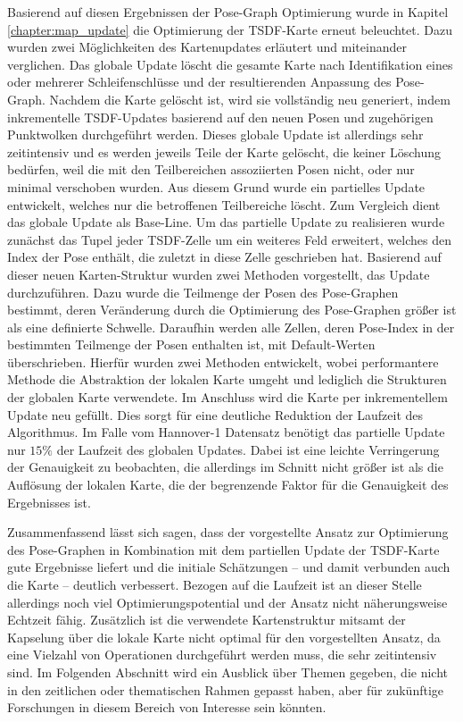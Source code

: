 Basierend auf diesen Ergebnissen der Pose-Graph Optimierung wurde in Kapitel \ref{chapter:map_update} die Optimierung der TSDF-Karte erneut beleuchtet. Dazu wurden zwei Möglichkeiten des Kartenupdates erläutert und miteinander verglichen. Das globale Update löscht die gesamte Karte nach Identifikation eines oder mehrerer Schleifenschlüsse und der resultierenden Anpassung des Pose-Graph. Nachdem die Karte gelöscht ist, wird sie vollständig neu generiert, indem inkrementelle TSDF-Updates basierend auf den neuen Posen und zugehörigen Punktwolken durchgeführt werden. Dieses globale Update ist allerdings sehr zeitintensiv und es werden jeweils Teile der Karte gelöscht, die keiner Löschung bedürfen, weil die mit den Teilbereichen assoziierten Posen nicht, oder nur minimal verschoben wurden. Aus diesem Grund wurde ein partielles Update entwickelt, welches nur die betroffenen Teilbereiche löscht. Zum Vergleich dient das globale Update als Base-Line. Um das partielle Update zu realisieren wurde zunächst das Tupel jeder TSDF-Zelle um ein weiteres Feld erweitert, welches den Index der Pose enthält, die zuletzt in diese Zelle geschrieben hat. Basierend auf dieser neuen Karten-Struktur wurden zwei Methoden vorgestellt, das Update durchzuführen. Dazu wurde die Teilmenge der Posen des Pose-Graphen bestimmt, deren Veränderung durch die Optimierung des Pose-Graphen größer ist als eine definierte Schwelle. Daraufhin werden alle Zellen, deren Pose-Index in der bestimmten Teilmenge der Posen enthalten ist, mit Default-Werten überschrieben. Hierfür wurden zwei Methoden entwickelt, wobei performantere Methode die Abstraktion der lokalen Karte umgeht und lediglich die Strukturen der globalen Karte verwendete. Im Anschluss wird die Karte per inkrementellem Update neu gefüllt. Dies sorgt für eine deutliche Reduktion der Laufzeit des Algorithmus. Im Falle vom Hannover-1 Datensatz benötigt das partielle Update nur $15\%$ der Laufzeit des globalen Updates. Dabei ist eine leichte Verringerung der Genauigkeit zu beobachten, die allerdings im Schnitt nicht größer ist als die Auflösung der lokalen Karte, die der begrenzende Faktor für die Genauigkeit des Ergebnisses ist.

Zusammenfassend lässt sich sagen, dass der vorgestellte Ansatz zur Optimierung des Pose-Graphen in Kombination mit dem partiellen Update der TSDF-Karte gute Ergebnisse liefert und die initiale Schätzungen -- und damit verbunden auch die Karte -- deutlich verbessert. Bezogen auf die Laufzeit ist an dieser Stelle allerdings noch viel Optimierungspotential und der Ansatz nicht näherungsweise Echtzeit fähig. Zusätzlich ist die verwendete Kartenstruktur mitsamt der Kapselung über die lokale Karte nicht optimal für den vorgestellten Ansatz, da eine Vielzahl von Operationen durchgeführt werden muss, die sehr zeitintensiv sind. Im Folgenden Abschnitt wird ein Ausblick über Themen gegeben, die nicht in den zeitlichen oder thematischen Rahmen gepasst haben, aber für zukünftige Forschungen in diesem Bereich von Interesse sein könnten.

